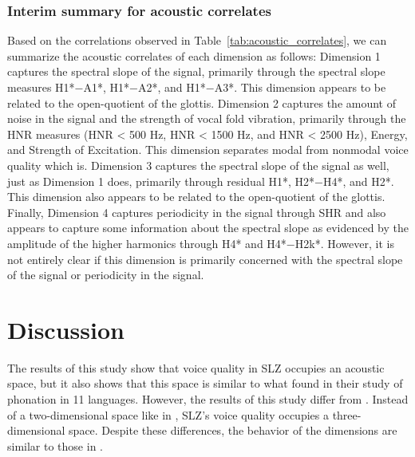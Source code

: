 \subsubsection{Interim summary for acoustic correlates} \label{sec:acousticlandscape:interim_correlates}

Based on the correlations observed in Table~\ref{tab:acoustic_correlates}, we can summarize the acoustic correlates of each dimension as follows: Dimension 1 captures the spectral slope of the signal, primarily through the spectral slope measures H1*$-$A1*, H1*$-$A2*, and H1*$-$A3*. This dimension appears to be related to the open-quotient of the glottis. Dimension 2 captures the amount of noise in the signal and the strength of vocal fold vibration, primarily through the HNR measures (HNR < 500 Hz, HNR < 1500 Hz, and HNR < 2500 Hz), Energy, and Strength of Excitation. This dimension separates modal from nonmodal voice quality which is. Dimension 3 captures the spectral slope of the signal as well, just as Dimension 1 does, primarily through residual H1*, H2*$-$H4*, and H2*. This dimension also appears to be related to the open-quotient of the glottis. Finally, Dimension 4 captures periodicity in the signal through SHR and also appears to capture some information about the spectral slope as evidenced by the amplitude of the higher harmonics through H4* and H4*$-$H2k*. However, it is not entirely clear if this dimension is primarily concerned with the spectral slope of the signal or periodicity in the signal.

\section{Discussion} \label{sec:acousticlandscape:discussion}

The results of this study show that voice quality in SLZ occupies an acoustic space, but it also shows that this space is similar to what \citet{keatingCrosslanguageAcousticSpace2023} found in their study of phonation in 11 languages. However, the results of this study differ from \citet{keatingCrosslanguageAcousticSpace2023}. Instead of a two-dimensional space like in \citet{keatingCrosslanguageAcousticSpace2023}, SLZ's voice quality occupies a three-dimensional space. Despite these differences, the behavior of the dimensions are similar to those in \citet{keatingCrosslanguageAcousticSpace2023}. 

